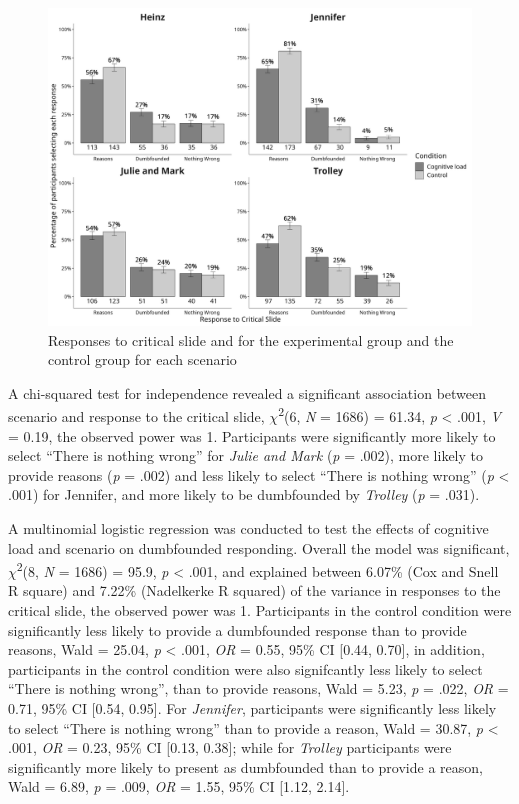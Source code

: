 \documentclass[
  man,floatsintext]{apa6}
\begin{document}
\begin{figure}
\centering
\includegraphics[width=6.25in,height=\textheight]{plots/all_scenarios.png}
\caption{Responses to critical slide and for the experimental group and the control group for each scenario}
\end{figure}

A chi-squared test for independence revealed a significant association between scenario and response to the critical slide, \(\chi\)\textsuperscript{2}(6, \emph{N} = 1686) = 61.34, \emph{p} \textless{} .001, \emph{V} = 0.19, the observed power was 1. Participants were significantly more likely to select ``There is nothing wrong'' for \emph{Julie and Mark} (\emph{p} = .002), more likely to provide reasons (\emph{p} = .002) and less likely to select ``There is nothing wrong'' (\emph{p} \textless{} .001) for Jennifer, and more likely to be dumbfounded by \emph{Trolley} (\emph{p} = .031).

A multinomial logistic regression was conducted to test the effects of cognitive load and scenario on dumbfounded responding. Overall the model was significant, \(\chi\)\textsuperscript{2}(8, \emph{N} = 1686) = 95.9, \emph{p} \textless{} .001, and explained between 6.07\% (Cox and Snell R square) and 7.22\% (Nadelkerke R squared) of the variance in responses to the critical slide, the observed power was 1. Participants in the control condition were significantly less likely to provide a dumbfounded response than to provide reasons, Wald = 25.04, \emph{p} \textless{} .001, \emph{OR} = 0.55, 95\% CI {[}0.44, 0.70{]}, in addition, participants in the control condition were also signifcantly less likely to select ``There is nothing wrong'', than to provide reasons, Wald = 5.23, \emph{p} = .022, \emph{OR} = 0.71, 95\% CI {[}0.54, 0.95{]}. For \emph{Jennifer}, participants were significantly less likely to select ``There is nothing wrong'' than to provide a reason, Wald = 30.87, \emph{p} \textless{} .001, \emph{OR} = 0.23, 95\% CI {[}0.13, 0.38{]}; while for \emph{Trolley} participants were significantly more likely to present as dumbfounded than to provide a reason, Wald = 6.89, \emph{p} = .009, \emph{OR} = 1.55, 95\% CI {[}1.12, 2.14{]}.
\end{document}
